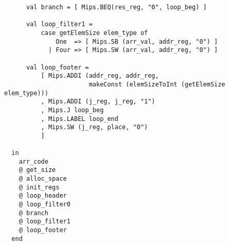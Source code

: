 \documentclass[12pt]{article}
\begin{document}
\begin{verbatim}
      val branch = [ Mips.BEQ(res_reg, "0", loop_beg) ]

      val loop_filter1 =
          case getElemSize elem_type of
              One  => [ Mips.SB (arr_val, addr_reg, "0") ]
            | Four => [ Mips.SW (arr_val, addr_reg, "0") ]

      val loop_footer =
          [ Mips.ADDI (addr_reg, addr_reg,
                       makeConst (elemSizeToInt (getElemSize elem_type)))
          , Mips.ADDI (j_reg, j_reg, "1")
          , Mips.J loop_beg
          , Mips.LABEL loop_end
          , Mips.SW (j_reg, place, "0")
          ]

  in
    arr_code
    @ get_size
    @ alloc_space
    @ init_regs
    @ loop_header
    @ loop_filter0
    @ branch
    @ loop_filter1
    @ loop_footer
  end
\end{verbatim}
\end{document}
